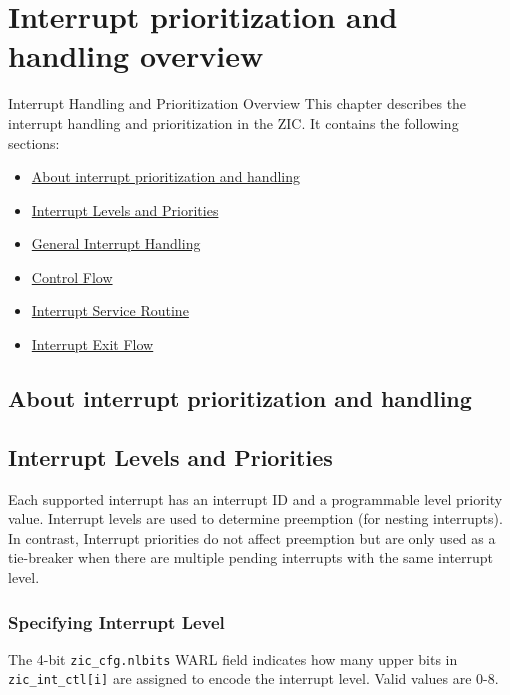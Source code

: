 \chapter{Interrupt prioritization and handling overview}

Interrupt Handling and Prioritization Overview
This chapter describes the interrupt handling and prioritization in the ZIC. It contains the following sections:

\begin{itemize}
    \item \hyperref[sec:about-interrupt-priority-handling]{About interrupt prioritization and handling}
    \item \hyperref[sec:interrupt-levels-priorities]{Interrupt Levels and Priorities}
    \item \hyperref[sec:general-interrupt-handling]{General Interrupt Handling}
    \item \hyperref[sec:control-flow]{Control Flow}
    \item \hyperref[sec:isr]{Interrupt Service Routine}
    \item \hyperref[sec:interrupt-exit-flow]{Interrupt Exit Flow}
\end{itemize}
\newpage

\section{About interrupt prioritization and handling}
\label{sec:about-interrupt-priority-handling}

\section{Interrupt Levels and Priorities}
\label{sec:interrupt-levels-priorities}

Each supported interrupt has an interrupt ID and a programmable level priority value. Interrupt levels are used to determine preemption (for nesting interrupts). In contrast, Interrupt priorities do not affect preemption but are only used as a tie-breaker when there are multiple pending interrupts with the same interrupt level.

\subsection{Specifying Interrupt Level}

The 4-bit \texttt{zic\_cfg.nlbits} WARL field indicates how many upper bits in \linebreak \texttt{zic\_int\_ctl[i]} are assigned to encode the interrupt level. Valid values are 0-8.

